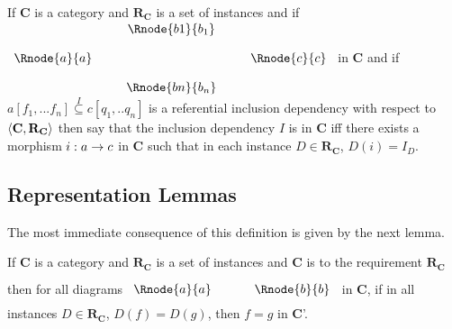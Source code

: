\documentclass[10pt,a4paper]{article}
\theoremstyle{remark}
\newcommand{\catc}[1][C]{\textbf{#1}}
\newcommand{\reqt}{\textbf{R}}
\newcommand{\reqtc}[1][\catc]{\reqt_{#1}}
\begin{document}
\begin{definition}
If $\catc$ is a category and $\reqtc$ is a set of instances and if
$
\begin{array}{c p{0.25cm} c  p{0.25cm} c }
             &&   \Rnode{b1}{b_1} &&              \\[0.4cm]
\Rnode{a}{a} &&                   && \Rnode{c}{c} \\[0.4cm]
             &&   \Rnode{bn}{b_n} &&              
\end{array} 
$
in $\catc$ and if $a[f_1,...f_n] \overset{I}{\subseteq} c[q_1,..q_n]$ is a referential inclusion dependency
with respect  to $\tuple{\catc,\reqtc}$ then say that the inclusion dependency $I$ is  in $\catc$
iff there exists a morphism $i:a \rightarrow c$ in $\catc$ such that in each instance $D \in \reqtc$, $D(i) = I_D$. 
\end{definition}


\subsection{Representation Lemmas}

The most immediate consequence of this definition is given by the next lemma.
\begin{lemma}
If $\catc$ is a category and $\reqtc$ is a set of instances  and $\catc$ is 
 to the requirement $\reqtc$ then
for all diagrams
$
\rule[-0.3cm]{0pt}{0.9cm} %
\begin{array}{c p{0.5cm} c  }
 \Rnode{a}{a}            &&   \Rnode{b}{b}
\end{array} 
$
in $\catc$,  if in all instances $D \in \reqtc$, $D(f)=D(g)$, 
then $f=g$ in $\catc$'.
\end{lemma}
\end{document}
